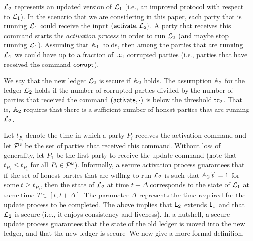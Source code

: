 


$\mathcal{L}_2$ represents an updated version of $\mathcal{L}_1$ (i.e., an improved protocol with respect to $\mathcal{L}_1$).
In the scenario that we are considering in this paper, each party that is running $\mathcal{L}_1$ could receive the input $(\mathsf{activate}, \mathcal{L}_2)$. A party
that receives this command starts the \emph{activation process}
in order to run $\mathcal{L}_2$ (and maybe stop running $\mathcal{L}_1$).
Assuming that $\mathbb{A}_1$ holds, then among the parties that are running $\mathcal{L}_1$ we could have up to a fraction of $\mathsf{tc}_1$ corrupted parties (i.e., parties that have received the command $\mathsf{corrupt}$).

We say that the new ledger $\mathcal{L}_2$ is secure if $\mathbb{A}_2$ holds. The assumption $\mathbb{A}_2$ for the ledger $\mathcal{L}_2$ holds if the number of corrupted parties
divided by the number of parties that received the command $(\mathsf{activate}, \cdot)$ is below the threshold $\mathsf{tc}_2$.
That is, $\mathbb{A}_2$ requires that there is a sufficient number of honest parties that are running $\mathcal{L}_2$.


Let $t_{P_i}$ denote the time in which
a party $P_i$ receives the activation command and let $\mathcal{P}^\mathsf{u}$ be the set of parties that received this command. Without loss of generality, let $P_1$ be the first party to receive the update command (note that $t_{P_1}\leq t_{P_i}$ for all $P_i\in\mathcal{P}^\mathsf{u}$).
Informally, a secure activation process guarantees that if the set of honest parties that are willing to run $\mathcal{L}_2$
is such that $\mathbb{A}_2[t]=1$ for some $t\geq t_{P_1}$, then
the state of $\mathcal{L}_2$ at time $t+\Delta$ corresponds to the state of $\mathcal{L}_1$ at some time
$T\in [t,t+\Delta]$.
The parameter $\Delta$ represents the time required for the update process to be completed.
The above implies that $\mathsf{L}_2$  extends $\mathsf{L}_1$ and that $\mathcal{L}_2$ is secure (i.e., it enjoys consistency and liveness).
In a nutshell, a secure update process guarantees that the state of the old ledger is moved into the new ledger, and that the new ledger is secure.
We now give a more formal definition.

